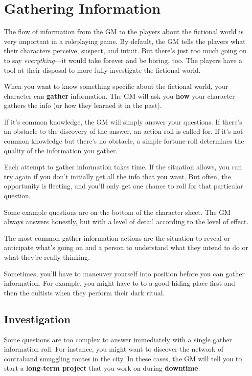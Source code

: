 \section{Gathering Information}


The flow of information from the GM to the players about the fictional world is very important in a roleplaying game. By default, the GM tells the players what their characters perceive, suspect, and intuit. But there’s just too much going on to say \emph{everything}---it would take forever and be boring, too. The players have a tool at their disposal to more fully investigate the fictional world.

When you want to know something specific about the fictional world, your character can \textbf{gather} information. The GM will ask you \textbf{how} your character gathers the info (or how they learned it in the past).

If it’s common knowledge, the GM will simply answer your questions. If there’s an obstacle to the discovery of the answer, an action roll is called for. If it’s not common knowledge but there’s no obstacle, a simple fortune roll determines the quality of the information you gather.

Each attempt to gather information takes time. If the situation allows, you can try again if you don’t initially get all the info that you want. But often, the opportunity is fleeting, and you’ll only get one chance to roll for that particular question.

Some example questions are on the bottom of the character sheet. The GM always answers honestly, but with a level of detail according to the level of effect.

The most common gather information actions are  the situation to reveal or anticipate what’s going on and  a person to understand what they intend to do or what they’re really thinking.

Sometimes, you’ll have to maneuver yourself into position before you can gather information. For example, you might have to  to a good hiding place first and then  the cultists when they perform their dark ritual.

\subsection{Investigation}

Some questions are too complex to answer immediately with a single gather information roll. For instance, you might want to discover the network of contraband smuggling routes in the city. In these cases, the GM will tell you to start a \textbf{long-term project} that you work on during \textbf{downtime}.

